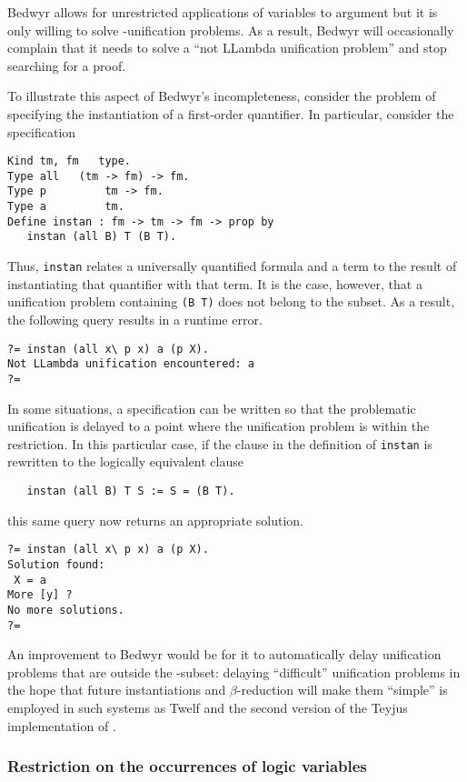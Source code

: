 Bedwyr allows for unrestricted applications of variables to argument
but it is only willing to solve \Ll-unification problems.  As a result,
Bedwyr will occasionally complain that it needs to solve a ``not LLambda
unification problem'' and stop searching for a proof.

To illustrate this aspect of Bedwyr's incompleteness, consider the
problem of specifying the instantiation of a first-order quantifier.
In particular, consider the specification
\begin{verbatim}
Kind tm, fm   type.
Type all   (tm -> fm) -> fm.
Type p         tm -> fm.
Type a         tm.
Define instan : fm -> tm -> fm -> prop by
   instan (all B) T (B T).
\end{verbatim}
Thus, {\tt instan} relates a universally quantified formula and a term
to the result of instantiating that quantifier with that term.
It is the case, however, that a
unification problem containing \verb+(B T)+ does not belong to the
\Ll{} subset.
As a result, the following query results in a runtime error.
\begin{verbatim}
?= instan (all x\ p x) a (p X).
Not LLambda unification encountered: a
?=
\end{verbatim}
In some situations, a specification can be written so that the
problematic unification is delayed to a point where the unification
problem is within the \Ll{} restriction.  In this particular case, if
the clause in the definition of {\tt instan} is rewritten to the
logically equivalent clause
\begin{verbatim}
   instan (all B) T S := S = (B T).
\end{verbatim}
this same query now returns an appropriate solution.
\begin{verbatim}
?= instan (all x\ p x) a (p X).
Solution found:
 X = a
More [y] ?
No more solutions.
?=
\end{verbatim}
An improvement to Bedwyr would be for it to automatically delay
unification problems that are outside the \Ll-subset: delaying
``difficult'' unification problems in the hope that future
instantiations and $\beta$-reduction will make them ``simple'' is
employed in such systems as Twelf and the second version of the Teyjus
implementation of \lp{} \cite{teyjus.website}.

\subsubsection{Restriction on the occurrences of logic variables}
\label{restrict-logic-variables}

